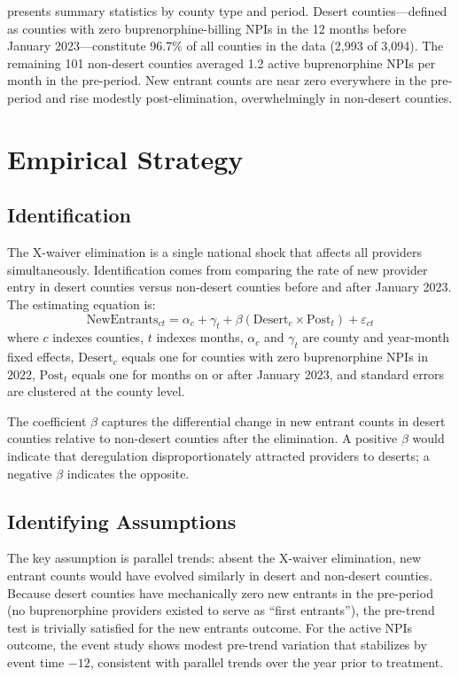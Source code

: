 \documentclass[12pt]{article}
\begin{document}


 presents summary statistics by county type and period. Desert counties---defined as counties with zero buprenorphine-billing NPIs in the 12 months before January 2023---constitute 96.7\% of all counties in the data (2,993 of 3,094). The remaining 101 non-desert counties averaged 1.2 active buprenorphine NPIs per month in the pre-period. New entrant counts are near zero everywhere in the pre-period and rise modestly post-elimination, overwhelmingly in non-desert counties.

\section{Empirical Strategy}

\subsection{Identification}

The X-waiver elimination is a single national shock that affects all providers simultaneously. Identification comes from comparing the rate of new provider entry in desert counties versus non-desert counties before and after January 2023. The estimating equation is:
\begin{equation}
\text{NewEntrants}_{ct} = \alpha_c + \gamma_t + \beta (\text{Desert}_c \times \text{Post}_t) + \varepsilon_{ct}
\label{eq:did}
\end{equation}
where $c$ indexes counties, $t$ indexes months, $\alpha_c$ and $\gamma_t$ are county and year-month fixed effects, $\text{Desert}_c$ equals one for counties with zero buprenorphine NPIs in 2022, $\text{Post}_t$ equals one for months on or after January 2023, and standard errors are clustered at the county level.

The coefficient $\beta$ captures the differential change in new entrant counts in desert counties relative to non-desert counties after the elimination. A positive $\beta$ would indicate that deregulation disproportionately attracted providers to deserts; a negative $\beta$ indicates the opposite.

\subsection{Identifying Assumptions}

The key assumption is parallel trends: absent the X-waiver elimination, new entrant counts would have evolved similarly in desert and non-desert counties. Because desert counties have mechanically zero new entrants in the pre-period (no buprenorphine providers existed to serve as ``first entrants''), the pre-trend test is trivially satisfied for the new entrants outcome. For the active NPIs outcome, the event study shows modest pre-trend variation that stabilizes by event time $-12$, consistent with parallel trends over the year prior to treatment.
\end{document}
